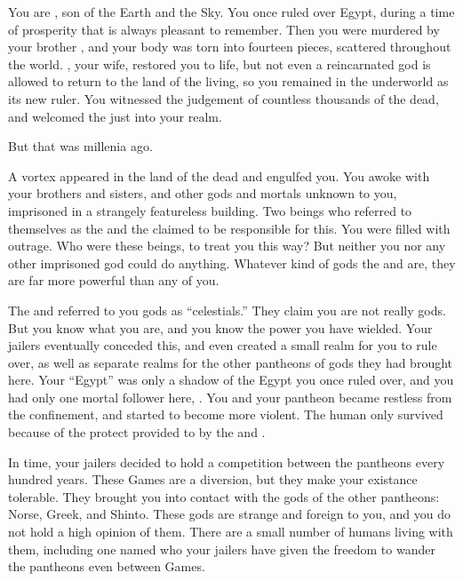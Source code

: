 \documentclass[char]{guardians}
\begin{document}
\name{\cOsiris{}}

You are \cOsiris{}, son of the Earth and the Sky. You once ruled over Egypt, during a time of prosperity that is always pleasant to remember. Then you were murdered by your brother \cSet{}, and your body was torn into fourteen pieces, scattered throughout the world. \cIsis{}, your wife, restored you to life, but not even a reincarnated god is allowed to return to the land of the living, so you remained in the underworld as its new ruler. You witnessed the judgement of countless thousands of the dead, and welcomed the just into your realm.

But that was millenia ago.

A vortex appeared in the land of the dead and engulfed you. You awoke with your brothers and sisters, and other gods and mortals unknown to you, imprisoned in a strangely featureless building. Two beings who referred to themselves as the \cCaretaker{} and the \cWarden{} claimed to be responsible for this. You were filled with outrage. Who were these beings, to treat you this way? But neither you nor any other imprisoned god could do anything. Whatever kind of gods the \cCaretaker{} and \cWarden{} are, they are far more powerful than any of you.

The \cCaretaker{} and \cWarden{} referred to you gods as ``celestials.'' They claim you are not really gods. But you know what you are, and you know the power you have wielded. Your jailers eventually conceded this, and even created a small realm for you to rule over, as well as separate realms for the other pantheons of gods they had brought here. Your ``Egypt'' was only a shadow of the Egypt you once ruled over, and you had only one mortal follower here, \cEgyptianHuman{}. You and your pantheon became restless from the confinement, and started to become more violent. The human \cEgyptianHuman{} only survived because of the protect provided to \cEgyptianHuman{\them} by the \cWarden{} and \cCaretaker{}.

In time, your jailers decided to hold a competition between the pantheons every hundred years. These Games are a diversion, but they make your existance tolerable. They brought you into contact with the gods of the other pantheons: Norse, Greek, and Shinto. These gods are strange and foreign to you, and you do not hold a high opinion of them. There are a small number of humans living with them, including one named \cJascha{} who your jailers have given the freedom to wander the pantheons even between Games.
\end{document}
